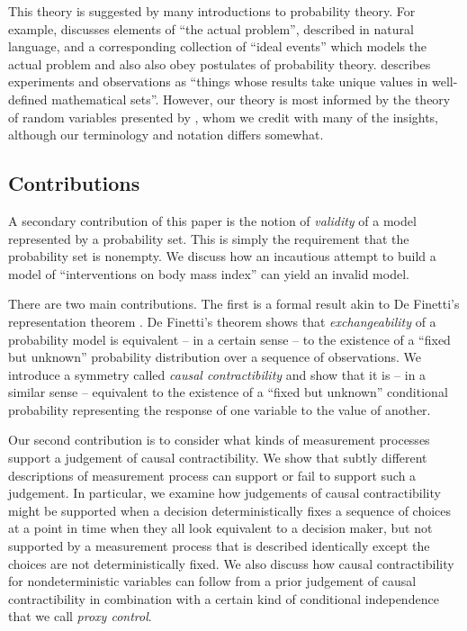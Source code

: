\documentclass{article}
\theoremstyle{plain}
\theoremstyle{definition}
\begin{document}
This theory is suggested by many introductions to probability theory. For example, \citet{boole_theory_1862} discusses elements of ``the actual problem'', described in natural language, and a corresponding collection of ``ideal events'' which models the actual problem and also also obey postulates of probability theory. \citet{feller_introduction_1968} describes experiments and observations as ``things whose results take unique values in well-defined mathematical sets''. However, our theory is most informed by the theory of random variables presented by \citet{menger_random_2003}, whom we credit with many of the insights, although our terminology and notation differs somewhat.

\subsection{Contributions}

A secondary contribution of this paper is the notion of \emph{validity} of a model represented by a probability set. This is simply the requirement that the probability set is nonempty.  We discuss how an incautious attempt to build a model of ``interventions on body mass index'' can yield an invalid model.

There are two main contributions. The first is a formal result akin to De Finetti's representation theorem \citep{de_finetti_foresight_1992}. De Finetti's theorem shows that \emph{exchangeability} of a probability model is equivalent -- in a certain sense -- to the existence of a ``fixed but unknown'' probability distribution over a sequence of observations. We introduce a symmetry called \emph{causal contractibility} and show that it is -- in a similar sense -- equivalent to the existence of a ``fixed but unknown'' conditional probability representing the response of one variable to the value of another.

Our second contribution is to consider what kinds of measurement processes support a judgement of causal contractibility. We show that subtly different descriptions of measurement process can support or fail to support such a judgement. In particular, we examine how judgements of causal contractibility might be supported when a decision deterministically fixes a sequence of choices at a point in time when they all look equivalent to a decision maker, but not supported by a measurement process that is described identically except the choices are not deterministically fixed. We also discuss how causal contractibility for nondeterministic variables can follow from a prior judgement of causal contractibility in combination with a certain kind of conditional independence that we call \emph{proxy control}.
\end{document}
